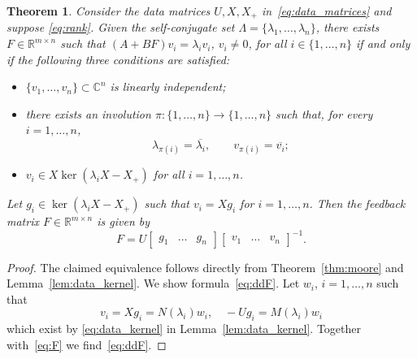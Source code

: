 \documentclass[11pt]{article}
\theoremstyle{plain}
\newtheorem{theorem}{Theorem}
\theoremstyle{definition}
\theoremstyle{remark}
\begin{document}
\begin{theorem}
\label{thm:moore_dd}
    Consider the data matrices $U,X,X_+$ in~\eqref{eq:data_matrices} and suppose \eqref{eq:rank}.
    Given the self-conjugate set $\Lambda=\{\lambda_1,\dots,\lambda_n\}$, there exists $F\in \mathbb R^{m\times n}$ such that $(A+BF)v_i = \lambda_i v_i$, $v_i\neq 0$, for all $i\in\{1,\dots, n\}$ if and only if the following three conditions are satisfied:
\begin{itemize}
    \item[\rm (i)] $\{v_1,\dots, v_n\}\subset \mathbb C^{n}$ is linearly independent;
  \item[\rm (ii)] there exists an involution
$\pi:\{1,\ldots,n\}\to\{1,\ldots,n\}$ such that, for every
$i=1,\ldots,n$,
\[
    \lambda_{\pi(i)}=\overline{\lambda_i},
    \qquad
    v_{\pi(i)}=\overline{v_i};
\]
    \item[\rm (iii)] $v_i\in X \operatorname{ker}(\lambda_i X-X_+)$ for all $i=1,\ldots,n$.
\end{itemize}

Let $g_i\in \ker(\lambda_i X-X_+)$ such that $v_i=Xg_i$ for $i=1,\dots, n$. Then the feedback matrix $F\in\mathbb{R}^{m\times n}$ is given by
\begin{equation}
\label{eq:ddF}
    F = U\begin{bmatrix}
        g_1 & \dots &  g_n
    \end{bmatrix} \begin{bmatrix}
        v_1 & \dots & v_n
    \end{bmatrix}^{-1}.
\end{equation}
\end{theorem}

\begin{proof}
    The claimed equivalence follows directly from Theorem~\ref{thm:moore} and Lemma~\ref{lem:data_kernel}. We show formula~\eqref{eq:ddF}. Let $w_i$, $i=1,\dots, n$ such that
    \begin{equation}
        v_i = X g_i = N(\lambda_i)w_i,\quad -U g_i = M(\lambda_i) w_i
    \end{equation}
    which exist by \eqref{eq:data_kernel} in Lemma~\ref{lem:data_kernel}. Together with~\eqref{eq:F} we find~\eqref{eq:ddF}.
\end{proof}
\end{document}
